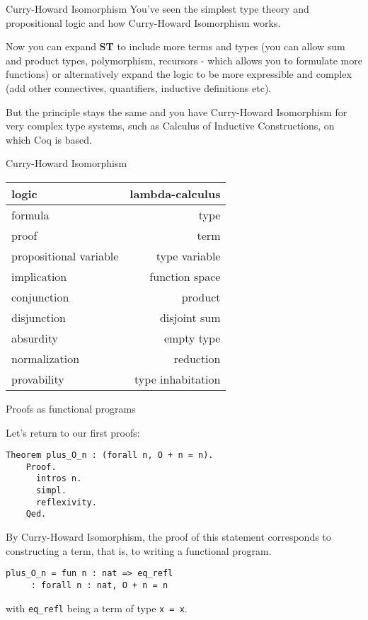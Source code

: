 \documentclass[10pt]{beamer}
\begin{document}
      

      

    

\begin{frame}{Curry-Howard Isomorphism}
             You've seen the simplest type theory and propositional logic and how Curry-Howard Isomorphism works.
    
             Now you can expand {\bf ST} to include more terms and types (you can allow sum and product types, polymorphism, recursors - which allows you to formulate more functions) or alternatively expand the logic to be more expressible and complex (add other
             connectives, quantifiers, inductive definitions etc).
    
             But the principle stays the same and you have Curry-Howard Isomorphism for very complex type systems, such as Calculus of Inductive Constructions, on which Coq is based. 
\end{frame}

\begin{frame}{Curry-Howard Isomorphism}
       
       \begin{tabular}{ l | r }
         {\bf logic } & {\bf lambda-calculus} \\
         \hline
         formula & type  \\
         proof & term \\
         propositional variable & type variable  \\
         implication & function space  \\
         conjunction & product \\
         disjunction & disjoint sum \\
         absurdity & empty type \\
         normalization & reduction \\
         provability & type inhabitation \\      
       \end{tabular}
\end{frame}
       
\begin{frame}[fragile]{Proofs as functional programs}

  Let's return to our first proofs:

  \begin{lstlisting}[language=Coq]
    Theorem plus_O_n : (forall n, O + n = n).
    Proof.
      intros n.
      simpl.
      reflexivity.
    Qed.

  \end{lstlisting}

  By Curry-Howard Isomorphism, the proof of this statement corresponds to constructing a term, that is, to writing a functional program.

   \begin{lstlisting}[language=Coq]
    plus_O_n = fun n : nat => eq_refl
     : forall n : nat, O + n = n
  \end{lstlisting}

 with \texttt{eq\_refl} being a term of type \texttt{x = x}.
  
\end{frame}
\end{document}
